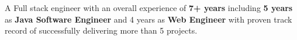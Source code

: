 \documentclass[10pt,a4paper,ragged2e,withhyper]{altacv}
\begin{document}
\begin{paracol}{2}
\begin{itemize}
\end{itemize}











\switchcolumn

A Full stack engineer with an overall experience of \textbf{7+ years} including \textbf{5 years} as \textbf{Java Software Engineer} and 4 years as \textbf{Web Engineer} with proven track record of successfully delivering more than 5 projects.\\~\\


\end{paracol}
\end{document}

